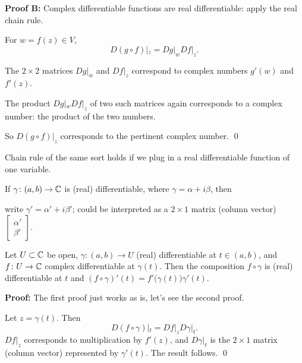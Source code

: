 \documentclass[10pt,aspectratio=169]{beamer}
\begin{document}
\begin{frame}

\textbf{Proof B:}
Complex differentiable functions are real differentiable:
apply the real chain rule.

\medskip
\pause

For $w = f(z) \in V$,
\[
D(g \circ f)|_z = Dg|_w Df|_z .
\]
\pause

The $2 \times 2$ matrices $Dg|_w$ and $Df|_z$ correspond to complex
numbers $g'(w)$ and $f'(z)$.

\medskip
\pause

The product $Dg|_w Df|_z$ of two such matrices again corresponds to a
complex number: the product of the two numbers.

\medskip
\pause

So $D(g \circ f)|_z$ corresponds to the 
pertinent complex number.
\qed
\end{frame}

\begin{frame}
Chain rule of the same sort holds if we plug in a real differentiable function of
one variable.

\medskip
\pause

If $\gamma \colon (a,b) \to {\mathbb{C}}$ is (real) differentiable, where
$\gamma = \alpha + i \beta$, then

\medskip
\pause

write $\gamma' = \alpha' + i \beta'$; could be interpreted as 
a $2 \times 1$ matrix (column vector)
$\left[\begin{smallmatrix}\alpha'\\\beta'\end{smallmatrix}\right]$.

\pause

\begin{proposition}
%
\label{prop:chainrule2}%
Let $U \subset {\mathbb{C}}$ be open,
$\gamma \colon (a,b) \to U$ (real) differentiable at $t \in (a,b)$,
and $f \colon U \to {\mathbb{C}}$ complex differentiable at $\gamma(t)$.
Then the composition $f \circ \gamma$ is (real) differentiable
at $t$ and $(f \circ \gamma)'(t) = f'\bigl(\gamma(t)\bigr) \gamma'(t)$.
\end{proposition}

\pause
\textbf{Proof:}
The first proof just works as is, let's see the second proof.

\medskip
\pause

Let $z = \gamma(t)$.  \pause Then 
\[
D(f \circ \gamma)|_{t} =
Df|_z D\gamma|_{t} .
\]
\pause
$Df|_z$ corresponds
to multiplication by $f'(z)$, and $D\gamma|_{t}$
is the $2 \times 1$ matrix (column vector) represented by $\gamma'(t)$.
\pause
The result follows.
\qed
\end{frame}
\end{document}
